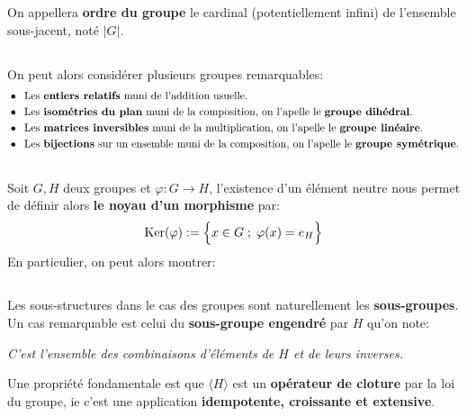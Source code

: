 On appellera \textbf{ordre du groupe} le cardinal (potentiellement infini) de l'ensemble sous-jacent, noté \(|G|\).

\subsection*{}
On peut alors considérer plusieurs groupes remarquables:
\begin{align*}
   &\bullet \;\; \text{Les \textbf{entiers relatifs} muni de l'addition usuelle.}\\
   &\bullet \;\; \text{Les \textbf{isométries du plan} muni de la composition, on l'apelle le \textbf{groupe dihédral}.}\\   
   &\bullet \;\; \text{Les \textbf{matrices inversibles} muni de la multiplication, on l'apelle le \textbf{groupe linéaire}.}\\
   &\bullet \;\; \text{Les \textbf{bijections} sur un ensemble muni de la composition, on l'apelle le \textbf{groupe symétrique}.}
\end{align*}
\subsection*{}
Soit \(G, H\) deux groupes et \(\varphi: G \rightarrow H\), l'existence d'un élément neutre nous permet de définir alors \textbf{le noyau d'un morphisme} par:
\[
   \text{Ker}(\varphi) := \Bigl\{ x \in G \; ; \; \varphi(x) = e_H \Bigl\}
\]
En particulier, on peut alors montrer:
\subsection*{}
Les sous-structures dans le cas des groupes sont naturellement les \textbf{sous-groupes}. Un cas remarquable est celui du \textbf{sous-groupe engendré} par \(H\) qu'on note:
\begin{center}
   \textit{C'est l'ensemble des combinaisons d'éléments de \(H\) et de leurs inverses.}
\end{center}
Une propriété fondamentale est que \(\langle H \rangle\) est un \textbf{opérateur de cloture} par la loi du groupe, ie c'est une application \textbf{idempotente, croissante et extensive}.\<

